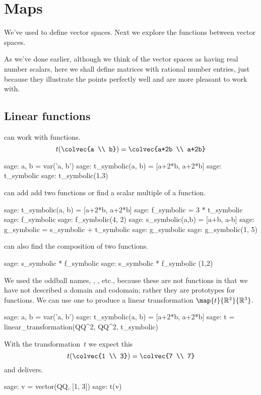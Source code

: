 \chapter{Maps}\label{chapter:maps}


We've used \Sage{} to define vector spaces.
Next we explore the functions between vector spaces.

As we've done earlier, although we think of the vector spaces 
as having real number scalars, here
we shall define matrices with rational number
entries, just because they illustrate the points perfectly well
and are more pleasant to work with.
  

\section{Linear functions} \label{sec:linearfunctions}
\Sage{} can work with functions.
\begin{equation*}
  t(\colvec{a \\ b})
  =\colvec{a+2b \\ a+2b}
\end{equation*}
\begin{sagecommandline}
sage: a, b = var('a, b')   
sage: t_symbolic(a, b) = [a+2*b, a+2*b]         
sage: t_symbolic       
sage: t_symbolic(1,3)       
\end{sagecommandline}

\Sage{} can add add two functions or find a scalar multiple of a function.
\begin{sagecommandline}
sage: t_symbolic(a, b) = [a+2*b, a+2*b]         
sage: f_symbolic = 3 * t_symbolic
sage: f_symbolic
sage: f_symbolic(4, 2)
sage: s_symbolic(a,b) = [a+b, a-b]
sage: g_symbolic = s_symbolic + t_symbolic
sage: g_symbolic
sage: g_symbolic(1, 5) 
\end{sagecommandline}
\Sage{} can also find the composition of two functions.
\begin{sagecommandline}
sage: s_symbolic * f_symbolic
sage: s_symbolic * f_symbolic (1,2)
\end{sagecommandline}

We used the oddball names, 
, , etc.,
because these are not functions in that we have not described a domain
and codomain; rather they are prototypes for functions.  
We can use one to produce a linear transformation $\map{t}{\Re^2}{\Re^3}$.
\begin{sagecommandline} 
sage: a, b = var('a, b')   
sage: t_symbolic(a, b) = [a+2*b, a+2*b]         
sage: t = linear_transformation(QQ^2, QQ^2, t_symbolic)
\end{sagecommandline}
With the transformation~$t$ we expect this
\begin{equation*}
  t(\colvec{1 \\ 3})
  =\colvec{7 \\ 7}
\end{equation*}
and \Sage{} delivers.
\begin{sagecommandline}
sage: v = vector(QQ, [1, 3])
sage: t(v)
\end{sagecommandline}



